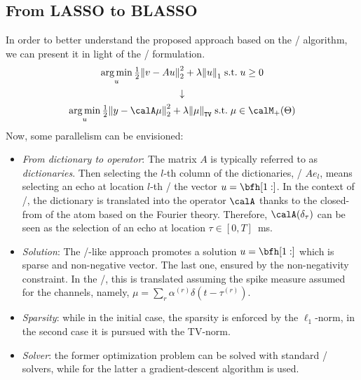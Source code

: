 \subsection{From LASSO to BLASSO}
In order to better understand the proposed approach based on the \BLASSO/ algorithm, we can present it in light of the \LASSO/ formulation.
\begin{gather*}
    \kargmin_u \tfrac{1}{2} \kvvbar{v - A u}_2^2 + \lambda \kvvbar{u}_1 \;\text{s.t.}\; u \geq 0\\
    \downarrow\\
    \kargmin_u \tfrac{1}{2} \kvvbar{y - \opObs\mu}_2^2 + \lambda \normTV{\mu} \;\text{s.t.}\; \mu \in\posDisRadonMeasure\\
\end{gather*}
Now, some parallelism can be envisioned:
\begin{itemize}
    \item\textit{From dictionary to operator}:
    The matrix $A$ is typically referred to as \textit{dictionaries}.
    Then selecting the $l$-th column of the dictionaries, \ie/ $Ae_l$, means selecting an echo at location $l$-th \wrt/ the vector $u = \bfh[1:]$.
    In the context of \CD/, the dictionary is translated into the operator $\opObs$ thanks to the closed-from of the atom based on the Fourier theory.
    Therefore, $\opObs(\delta_\tau)$ can be seen as the selection of an echo at location $\tau \in [0, T]$~ms.
    \item\textit{Solution}:
    The \LASSO/-like approach promotes a solution $u = \bfh[1:]$ which is sparse and non-negative vector. The last one, ensured by the non-negativity constraint.
    In the \BLASSO/, this is translated assuming the spike measure assumed for the channels, namely, $\mu = \sum_r \alpha^{(r)} \delta(t - \tau^{(r)})$.
    \item\textit{Sparsity}: while in the initial case, the sparsity is enforced by the $\ell_1$-norm, in the second case it is pursued with the TV-norm.
    \item\textit{Solver}: the former optimization problem can be solved with standard \LASSO/ solvers, while for the latter a gradient-descent algorithm is used.
\end{itemize}

